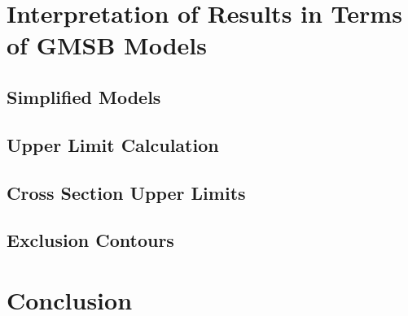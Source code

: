 \documentclass[12pt, letterpaper]{report}
\begin{document}
\chapter{Interpretation of Results in Terms of GMSB Models}
\section{Simplified Models}
\section{Upper Limit Calculation}
\section{Cross Section Upper Limits}
\section{Exclusion Contours}

\chapter{Conclusion}
\end{document}
